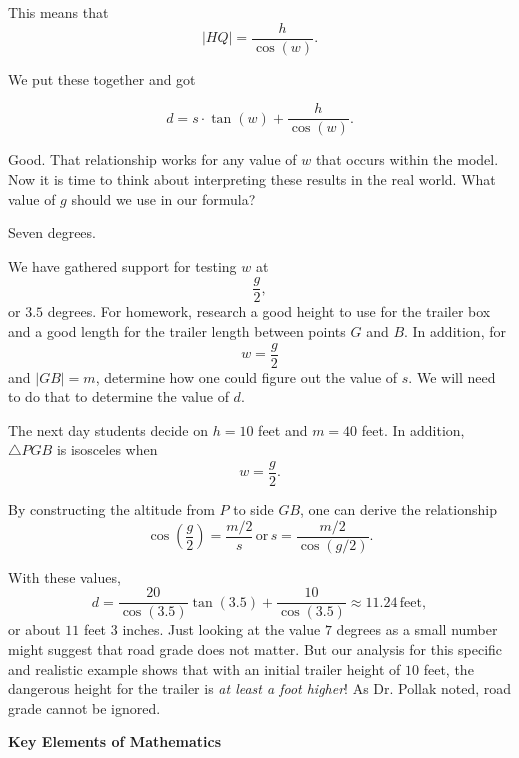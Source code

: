 {\begin{scriptlist}
      This means that
      $$
        \lvert HQ\rvert=\frac{h}{\cos(w)}.
      $$

      We put these together and got\vspace{1.5\baselineskip}

      $$
        d=s\cdot \tan(w)+\frac{h}{\cos(w)}.
      $$

      \item [Teacher:] Good. That relationship works for any value of $w$ that occurs within the model. Now it is time to think about interpreting these results in the real world. What value of $g$ should we use in our formula?
      
      \item [Class:] Seven degrees.
      
      \item [Teacher:] We have gathered support for testing $w$ at
      $$
        \frac{g}{2},
      $$
      or $3.5$ degrees. For homework, research a good height to use for the trailer box and a good length for the trailer length between points $G$ and $B$. In addition, for
      $$
        w=\frac{g}{2}
      $$
      and $\lvert GB\rvert = m$, determine how one could figure out the value of $s$. We will need to do that to determine the value of $d$.\vspace{.5\baselineskip}
    \end{scriptlist}

    The next day students decide on $h = 10$ feet and $m = 40$ feet. In addition, $\triangle PGB$ is isosceles when
    $$
      w=\frac{g}{2}.
    $$

    By constructing the altitude from $P$ to side $GB$, one can derive the relationship
    $$
      \cos\left(\frac{g}{2}\right)=\frac{m/2}{s} \, \text{or} \, s=\frac{m/2}{\cos(g/2)}.
    $$

    With these values,
    $$
      d=\frac{20}{\cos(3.5)}\tan(3.5)+\frac{10}{\cos(3.5)}\approx 11.24 \, \text{feet},
    $$
    or about $11$ feet $3$ inches. Just looking at the value $7$ degrees as a small number might suggest that road grade does not matter. But our analysis for this specific and realistic example shows that with an initial trailer height of $10$ feet, the dangerous height for the trailer is \emph{at least a foot higher}! As Dr. Pollak noted, road grade cannot be ignored.\vspace{\baselineskip}

    \textbf{Key Elements of Mathematics}

    \begin{hanglist}
    \end{hanglist}

}
